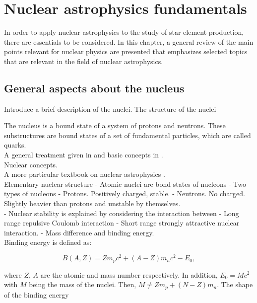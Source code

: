 \documentclass[openany]{book}
\begin{document}
\chapter{Nuclear astrophysics fundamentals}  \label{ch:nuclearAstrophysics}

In order to apply nuclear astrophysics to the study of star element production, there are essentials to be considered. In this chapter, a general review of the main points relevant for nuclear physics are presented that emphasizes selected topics that are relevant in the field of nuclear astrophysics.

\section{General aspects about the nucleus} \label{sec:nucleiAspects}
Introduce a brief description of the nuclei.
\indent The structure of the nuclei

The nucleus is a bound state of a system of protons and neutrons. These substructures are bound states of a set of fundamental particles, which are called quarks.  \\

A general treatment given in \cite{basdevant_rich_spiro_2004} and basic concepts in \cite{heyde_2020}. \\

\indent Nuclear concepts. \\

A more particular textbook on nuclear astrophysics \cite{iliadis_2015}. \\


Elementary nuclear structure 
-	Atomic nuclei are bond states of nucleons 
-	Two types of nucleons
	-	Protons. Positively charged, stable.
	-	Neutrons. No charged. Slightly heavier than protons and unstable by themselves. \\
	
-	Nuclear stability is explained by considering the interaction between 
	-	Long range repulsive Coulomb interaction 
	-   Short range strongly attractive nuclear interaction. 
	-	Mass difference and binding energy.
\\

Binding energy is defined as:

\begin{equation} \label{eq:restEnergy}
	 B(A, Z) = Zm_pc^2 + (A-Z)m_nc^2 - E_0,
\end{equation}

where $Z$, $A$ are the atomic and mass number respectively.  In addition, $E_0 = Mc^2$ with $M$ being the mass of the nuclei. Then, $M \neq Zm_p + (N - Z)m_n$. The shape of the binding energy \\
\end{document}
